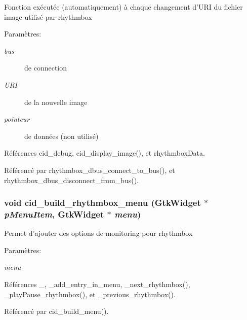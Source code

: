 Fonction exécutée (automatiquement) à chaque changement d'URI du fichier image utilisé par rhythmbox \begin{Desc}
\item[Paramètres:]
\begin{description}
\item[{\em bus}]de connection \item[{\em URI}]de la nouvelle image \item[{\em pointeur}]de données (non utilisé) \end{description}
\end{Desc}


Références cid\_\-debug, cid\_\-display\_\-image(), et rhythmboxData.

Référencé par rhythmbox\_\-dbus\_\-connect\_\-to\_\-bus(), et rhythmbox\_\-dbus\_\-disconnect\_\-from\_\-bus().
\subsubsection{\setlength{\rightskip}{0pt plus 5cm}void cid\_\-build\_\-rhythmbox\_\-menu (GtkWidget $\ast$ {\em pMenuItem}, \/  GtkWidget $\ast$ {\em menu})}\label{cid-rhythmbox_8h_543a017ccae2f9cfc1f0bf4aa3e38924}


Permet d'ajouter des options de monitoring pour rhythmbox \begin{Desc}
\item[Paramètres:]
\begin{description}
\item[{\em menu}]\end{description}
\end{Desc}


Références \_\-, \_\-add\_\-entry\_\-in\_\-menu, \_\-next\_\-rhythmbox(), \_\-playPause\_\-rhythmbox(), et \_\-previous\_\-rhythmbox().

Référencé par cid\_\-build\_\-menu().